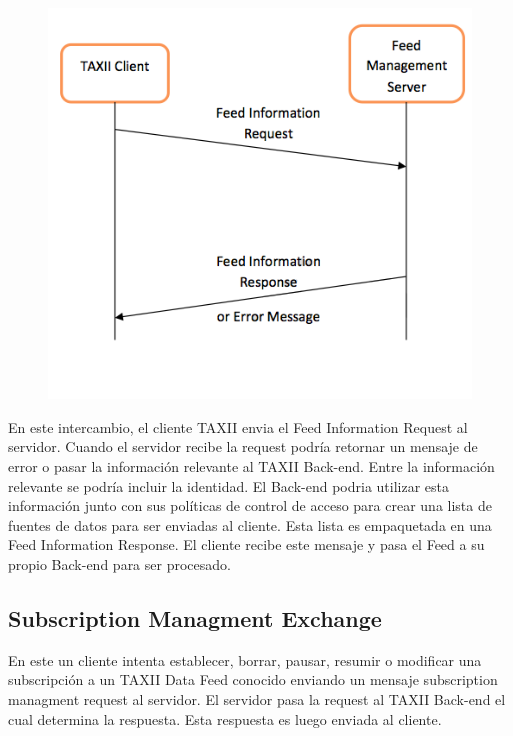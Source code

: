 \begin{figure}[ht!]
  \centering
    \includegraphics[width=150mm]{./Figures/FeedInformationExchange.png}
\end{figure}

En este intercambio, el cliente TAXII envia el Feed Information Request al 
servidor. Cuando el servidor recibe la request podría retornar un mensaje de 
error o pasar la información relevante al TAXII Back-end. Entre la información 
relevante se podría incluir la identidad. El Back-end podria utilizar esta 
información junto con sus políticas de control de acceso para crear una lista de 
fuentes de datos para ser enviadas al cliente. Esta lista es empaquetada en una 
Feed Information Response. El cliente recibe este mensaje y pasa el Feed a su 
propio Back-end para ser procesado.

\subsection{Subscription Managment Exchange}

En este un cliente intenta establecer, borrar, pausar, resumir o modificar una 
subscripción a un TAXII Data Feed conocido enviando un mensaje subscription 
managment request al servidor. El servidor pasa la request al TAXII Back-end el 
cual determina la respuesta. Esta respuesta es luego enviada al cliente.

